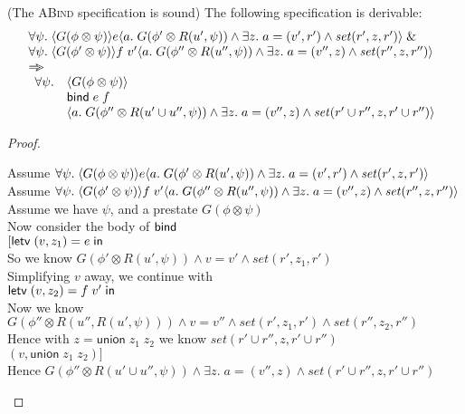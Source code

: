 \begin{prop*}{(The \textsc{ABind} specification is sound)}
The following specification is derivable:
\begin{displaymath}
\begin{array}{l}
\forall \psi.\; \langle{G(\phi \otimes \psi)}\rangle{e}\langle{a}.\;{G(\phi' \otimes R(u', \psi)) \land \exists z.\;a = (v', r') \land \mathit{set}(r', z, r')}\rangle 
                \;\&\; \\
\forall \psi.\; \langle{G(\phi' \otimes \psi)}\rangle{f\;v'}\langle{a}.\;{G(\phi'' \otimes R(u'', \psi)) \land \exists z.\; a = (v'', z) \land \mathit{set}(r'', z, r'')}\rangle\\
\Rightarrow\!\!\!> \\
\begin{array}{ll}
     \forall \psi. & \left<G(\phi \otimes \psi)\right> \\
                   & \mathsf{bind}\; e\;f \\
                   &  \left<a.\;G(\phi'' \otimes R(u' \cup u'', \psi)) \land \exists z.\;a = (v'', z) \land \mathit{set}(r' \cup r'', z, r' \cup r'')\right> \\
   \end{array}
\end{array}
\end{displaymath}
\end{prop*}

\begin{proof}
\begin{tabbedproof}
\oo Assume $\forall \psi.\; \langle{G(\phi \otimes \psi)}\rangle{e}\langle{a}.\;{G(\phi' \otimes R(u', \psi)) \land \exists z.\;a = (v', r') \land \mathit{set}(r', z, r')}\rangle$ \\
\oo Assume $\forall \psi.\; \langle{G(\phi' \otimes \psi)}\rangle{f\;v'}\langle{a}.\;{G(\phi'' \otimes R(u'', \psi)) \land \exists z.\; a = (v'', z) \land \mathit{set}(r'', z, r'')}\rangle$ \\
\oo Assume we have $\psi$, and a prestate $G(\phi \otimes \psi)$ \\
\ooo Now consider the body of $\mathsf{bind}\;$ \\
\ooo $[\mathsf{letv}\;(v, z_1) = e\;\mathsf{in}\;$ \\
\ooo So we know $G(\phi' \otimes R(u', \psi)) \land v = v' \land \mathit{set}(r', z_1, r')$ \\
\ooo Simplifying $v$ away, we continue with \\
\ooo $\mathsf{letv}\;(v, z_2) = f\;v'\;\mathsf{in}\;$ \\
\ooo Now we know $G(\phi'' \otimes R(u'', R(u', \psi))) \land v = v'' \land \mathit{set}(r', z_1, r') \land \mathit{set}(r'', z_2, r'')$ \\
\ooo Hence with $z = \mathsf{union}\;z_1\;z_2$ we know $\mathit{set}(r' \cup r'', z, r' \cup r'')$ \\
\ooo $(v, \mathsf{union}\;z_1\;z_2)]$ \\
\ooo Hence $G(\phi'' \otimes R(u' \cup u'', \psi)) \land \exists z.\; a = (v'', z) \land \mathit{set}(r' \cup r'', z, r' \cup r'')$ 
\end{tabbedproof}
\end{proof}

